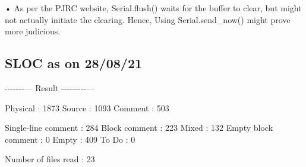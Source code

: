• As per the P\+J\+RC website, {\ttfamily Serial.\+flush()} waits for the buffer to clear, but might not actually initiate the clearing. Hence, Using {\ttfamily Serial.\+send\+\_\+now()} might prove more judicious.

\subsection*{S\+L\+OC as on 28/08/21}

-\/-\/-\/-\/-\/-\/-\/--- Result -\/-\/-\/-\/-\/-\/-\/-\/-\/--- \begin{DoxyVerb}        Physical :  1873
          Source :  1093
         Comment :  503
\end{DoxyVerb}
 Single-\/line comment \+: 284 Block comment \+: 223 Mixed \+: 132 Empty block comment \+: 0 Empty \+: 409 To Do \+: 0

Number of files read \+: 23 

 